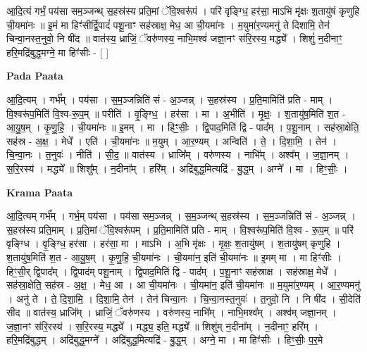 \documentclass[17pt]{extarticle}
\begin{document}
आ॒दि॒त्यं गर्भं॒ पय॑सा सम॒ञ्जन्थ् स॒हस्र॑स्य प्रति॒मां ॅवि॒श्वरू॑पं । परि॑ वृङ्ग्धि॒ हर॑सा॒ माऽभि मृ॑क्षः श॒तायु॑षं कृणुहि ची॒यमा॑नः ॥ इ॒मं मा हिꣳ॑सीर्द्वि॒पादं॑ पशू॒नाꣳ सह॑स्राक्ष॒ मेध॒ आ ची॒यमा॑नः । म॒युमा॑र॒ण्यमनु॑ ते दिशामि॒ तेन॑ चिन्वा॒नस्त॒नुवो॒ नि षी॑द ॥ वात॑स्य॒ ध्राजिं॒ ॅवरु॑णस्य॒ नाभि॒मश्वं॑ जज्ञा॒नꣳ स॑रि॒रस्य॒ मद्ध्ये᳚ । शिशुं॑ न॒दीनाꣳ॒॒ हरि॒मद्रि॑बुद्ध॒मग्ने॒ मा हिꣳ॑सीः - [  ] \newline

\textbf{Pada Paata} \newline

आ॒दि॒त्यम् । गर्भ᳚म् । पय॑सा । स॒म॒ञ्जन्निति॑ सं - अ॒ञ्जन्न् । स॒हस्र॑स्य । प्र॒ति॒मामिति॑ प्रति - माम् । वि॒श्वरू॑प॒मिति॑ वि॒श्व-रू॒प॒म् ॥ परीति॑ । वृ॒ङ्ग्धि॒ । हर॑सा । मा । अ॒भीति॑ । मृ॒क्षः॒ । श॒तायु॑ष॒मिति॑ श॒त - आ॒यु॒ष॒म् । कृ॒णु॒हि॒ । ची॒यमा॑नः ॥ इ॒मम् । मा । हिꣳ॒॒सीः॒ । द्वि॒पाद॒मिति॑ द्वि - पाद᳚म् । प॒शू॒नाम् । सह॑स्रा॒क्षेति॒ सह॑स्र - अ॒क्ष॒ । मेधे᳚ । एति॑ । ची॒यमा॑नः ॥ म॒युम् । आ॒र॒ण्यम् । अन्विति॑ । ते॒ । दि॒शा॒मि॒ । तेन॑ । चि॒न्वा॒नः । त॒नुवः॑ । नीति॑ । सी॒द॒ ॥ वात॑स्य । ध्राजि᳚म् । वरु॑णस्य । नाभि᳚म् । अश्व᳚म् । ज॒ज्ञा॒नम् । स॒रि॒रस्य॑ । मद्ध्ये᳚ ॥ शिशु᳚म् । न॒दीना᳚म् । हरि᳚म् । अद्रि॑बुद्ध॒मित्यद्रि॑ - बु॒द्ध॒म् । अग्ने᳚ । मा । हिꣳ॒॒सीः॒ ।  \newline


\textbf{Krama Paata} \newline

आ॒दि॒त्यम् गर्भ᳚म् । गर्भ॒म् पय॑सा । पय॑सा सम॒ञ्जन्न् । स॒म॒ञ्जन्थ् स॒हस्र॑स्य । स॒म॒ञ्जन्निति॑ सं - अ॒ञ्जन्न् । स॒हस्र॑स्य प्रति॒माम् । प्र॒ति॒मां ॅवि॒श्वरू॑पम् । प्र॒ति॒मामिति॑ प्रति - माम् । वि॒श्वरू॑प॒मिति॑ वि॒श्व - रू॒प॒म् ॥ परि॑ वृङ्ग्धि । वृ॒ङ्ग्धि॒ हर॑सा । हर॑सा॒ मा । माऽभि । अ॒भि मृ॑क्षः । मृ॒क्षः॒ श॒तायु॑षम् । श॒तायु॑षम् कृणुहि । श॒तायु॑ष॒मिति॑ श॒त - आ॒यु॒ष॒म् । कृ॒णु॒हि॒ ची॒यमा॑नः । ची॒यमा॑न॒ इति॑ ची॒यमा॑नः ॥ इ॒मम् मा । मा हिꣳ॑सीः । हिꣳ॒॒सी॒र् द्वि॒पाद᳚म् । द्वि॒पाद॑म् पशू॒नाम् । द्वि॒पाद॒मिति॑ द्वि - पाद᳚म् । प॒शू॒नाꣳ सह॑स्राक्ष । सह॑स्राक्ष॒ मेधे᳚ । सह॑स्रा॒क्षेति॒ सह॑स्र - अ॒क्ष॒ । मेध॒ आ । आ ची॒यमा॑नः । ची॒यमा॑न॒ इति॑ ची॒यमा॑नः ॥ म॒युमा॑र॒ण्यम् । आ॒र॒ण्यमनु॑ । अनु॑ ते । ते॒ दि॒शा॒मि॒ । दि॒शा॒मि॒ तेन॑ । तेन॑ चिन्वा॒नः । चि॒न्वा॒नस्त॒नुवः॑ । त॒नुवो॒ नि । नि षी॑द । सी॒देति॑ सीद ॥ वात॑स्य॒ ध्राजि᳚म् । ध्राजिं॒ ॅवरु॑णस्य । वरु॑णस्य॒ नाभि᳚म् । नाभि॒मश्व᳚म् । अश्व॑म् जज्ञा॒नम् । ज॒ज्ञा॒नꣳ स॑रि॒रस्य॑ । स॒रि॒रस्य॒ मद्ध्ये᳚ । मद्ध्य॒ इति॒ मद्ध्ये᳚ ॥ शिशु॑म् न॒दीना᳚म् । न॒दीनाꣳ॒॒ हरि᳚म् । हरि॒मद्रि॑बुद्धम् । अद्रि॑बुद्ध॒मग्ने᳚ । अद्रि॑बुद्ध॒मित्यद्रि॑ - बु॒द्ध॒म् । अग्ने॒ मा । मा हिꣳ॑सीः । हिꣳ॒॒सीः॒ प॒र॒मे \newline
\end{document}
